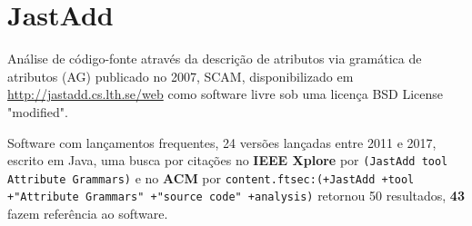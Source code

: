 \section{JastAdd}

Análise de código-fonte através da descrição de atributos via gramática de atributos (AG)
publicado no 2007, SCAM,
disponibilizado em \url{http://jastadd.cs.lth.se/web}
como software livre
sob uma licença BSD License "modified".

Software com lançamentos frequentes,
24 versões lançadas
entre 2011 e 2017,
escrito em Java,
uma busca por citações no {\bf IEEE Xplore} por
\texttt{(JastAdd tool Attribute Grammars)}
e no {\bf ACM} por
\texttt{content.ftsec:(+JastAdd +tool +"Attribute Grammars" +"source code" +analysis)}
retornou
50 resultados,
{\bf 43} fazem referência ao software.

